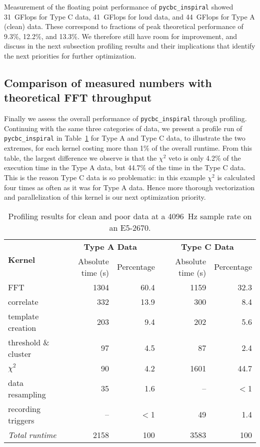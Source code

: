 Measurement of the floating point performance of \texttt{pycbc\_inspiral} showed
31~GFlops for Type C data, 41~GFlops for loud data, and 44~GFlops for Type A
(clean)
data.  These correspond to fractions of peak theoretical performance of 9.3\%,
12.2\%, and 13.3\%. We therefore still have room for improvement, and discuss in
the next subsection profiling results and their implications that identify the
next priorities for further optimization.


\vspace*{-10pt}
\subsection{Comparison of measured numbers with theoretical FFT throughput}
\vspace*{-05pt}
\label{sec:measured}

Finally we assess the overall performance of \texttt{pycbc\_inspiral} through
profiling. Continuing with the same three categories of data, we present a
profile run of \texttt{pycbc\_inspiral} in Table~\ref{tab:callgraph} for Type A and Type C data, to illustrate the two
extremes, for each kernel costing more than 1\% of the overall runtime. From
this table, the largest difference we observe is that the 
$\chi^2$ veto is only 4.2\% of the execution time in the Type A data, but 44.7\%
of the time in the Type C data. This is the reason Type C data is so problematic:
in this example $\chi^2$ is calculated four times as often as it was for Type
A data.
Hence more thorough vectorization and parallelization of this kernel is our next
optimization priority.

\begin{table}
  \centering
  \begin{tabular}{|l|r|r|r|r|}\hline
   \multirow{2}{*}{\textbf{Kernel}} & \multicolumn{2}{c|}{\textbf{Type A Data}}
    & \multicolumn{2}{|c|}{\textbf{Type C Data}} \\ \cline{2-5}
    & Absolute time (s) & Percentage & Absolute time (s) & Percentage \\ \hline
    FFT & 1304 & 60.4 & 1159 & 32.3 \\ \hline
    correlate & 332 & 13.9 & 300 & 8.4 \\ \hline
    template creation & 203 & 9.4 & 202 & 5.6 \\ \hline
    threshold \& cluster & 97 & 4.5 & 87 & 2.4 \\ \hline
    $\chi^2$ & 90 & 4.2 & 1601 & 44.7 \\ \hline
    data resampling & 35 & 1.6 & -- & $<$1 \\ \hline
    recording triggers & -- & $<$1 & 49 & 1.4 \\ \hline \hline
    \emph{Total runtime} & 2158 & 100 & 3583 & 100 \\ \hline
  \end{tabular}
  \caption{Profiling results for clean and poor data at a 4096~Hz sample
    rate on an E5-2670. }
  \label{tab:callgraph}
\end{table}

